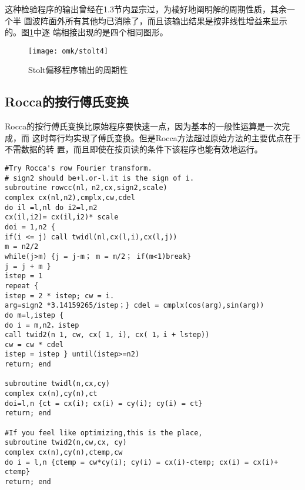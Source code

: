 这种检验程序的输出曾经在1.3节内显宗过，为棱好地阐明解的周期性质，其余一个半
圆波阵面外所有其他均已消除了，而且该输出结果是按非线性增益来显示的。图\ref{fig:omk/stolt4}中逐
端相接出现的是四个相同图形。
\begin{figure}[H]
\centering
\texttt{[image: omk/stolt4]}
\caption[stolt4]{Stolt偏移程序输出的周期性}
\label{fig:omk/stolt4}
\end{figure}
\subsection{Rocca的按行傅氏变换}
Rocca的按行傅氏变换比原始程序要快速一点，因为基本的一般性运算是一次完成，而
这时每行均实现了傅氏变换。但是Rocca方法超过原始方法的主要优点在于不需数据的转
置，而且即使在按页读的条件下该程序也能有效地运行。
\begin{verbatim}
#Try Rocca's row Fourier transform.
# sign2 should be+l.or-l.it is the sign of i. 
subroutine rowcc(nl，n2,cx,sign2,scale) 
complex cx(nl,n2),cmplx,cw,cdel 
do il =l,nl do i2=l,n2
cx(il,i2)= cx(il,i2)* scale
doi = 1,n2 {
if(i <= j) call twidl(nl,cx(l,i),cx(l,j))
m = n2/2
while(j>m) {j = j-m； m = m/2； if(m<1)break}
j = j + m } 
istep = 1
repeat {
istep = 2 * istep; cw = i.
arg=sign2 *3.14159265/istep；} cdel = cmplx(cos(arg),sin(arg))
do m=l,istep {
do i = m,n2，istep
call twid2(n 1, cw, cx( 1, i), cx( 1，i + lstep)) 
cw = cw * cdel
istep = istep } until(istep>=n2) 
return; end

subroutine twidl(n,cx,cy) 
complex cx(n),cy(n),ct
doi=l,n {ct = cx(i); cx(i) = cy(i); cy(i) = ct}
return; end

#If you feel like optimizing,this is the place, 
subroutine twid2(n,cw,cx, cy) 
complex cx(n),cy(n),ctemp,cw
do i = l,n {ctemp = cw*cy(i); cy(i) = cx(i)-ctemp; cx(i) = cx(i)+ ctemp} 
return; end
\end{verbatim}
